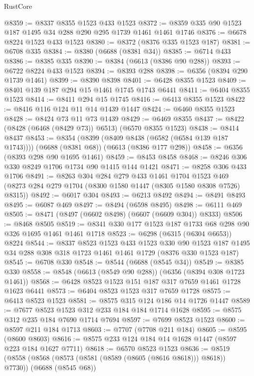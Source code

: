 \begin{lexlean}{RustCore}
\begin{coremodule}
@8359 := @8337 @8355 @1523 @433 @1523
@8372 := @8359 @335 @90 @1523 @187 @1495 @34 @288 @290 @295 @1739 @1461 @1461 @1746
@8376 := @6678 @8224 @1523 @433 @1523
@8380 := @8372 (@8376 @335 @1523 @187)
@8381 := @6708 @335
@8384 := @8380 (@6688 (@8381 @34))
@8385 := @6714 @433
@8386 := @8385 @335
@8390 := @8384 (@6613 (@8386 @90 @288))
@8393 := @6722 @8224 @433 @1523
@8394 := @8393 @288
@8398 := @6356 (@8394 @290 @1739 @1461)
@8399 := @8390 @8398
@8401 := @6428 @8355 @1523
@8409 := @8401 @139 @187 @294 @15 @1461 @1745 @1743 @6441
@8411 := @6404 @8355 @1523
@8414 := @8411 @294 @15 @1745
@8416 := @6413 @8355 @1523
@8422 := @8416 @116 @124 @11 @14 @1439 @1447
@8424 := @6460 @8355 @1523
@8428 := @8424 @73 @11 @73 @1439
@8429 := @6469 @8355
@8437 := @8422 (@8428 (@6468 (@8429 @73)) @6513) (@6570 @8355 @1523)
@8438 := @8414 @8437
@8453 := @8354
    (@8399 (@8409 @8438 (@6582 (@6584 @139 @187 @1743))))
    (@6688 (@8381 @68))
    (@6613 (@8386 @177 @298))
@8458 := @6356 (@8393 @298 @90 @1695 @1461)
@8459 := @8453 @8458
@8468 := @8246 @306 @330 @8249 @1706 @1734 @90 @1415 @144 @1421
@8471 := @8258 @306 @433 @1706
@8491 := @8263
    @304
    @284
    @279
    @433
    @1461
    @1704
    @1523
    @469
    (@8273 @284 @279 @1704 (@8300 @1580 @1447 (@8305 @1580 @8308 @7526) @8315))
@8492 := @6017 @304
@8493 := @6213 @8492
@8494 := @8491 @8493
@8495 := @6087 @469
@8497 := @8494 (@6598 @8495)
@8498 := @6111 @469
@8505 := @8471 (@8497 (@6602 @8498) (@6607 (@6609 @304)) @8333)
@8506 := @8468 @8505
@8519 := @8341 @330 @177 @1523 @187 @1733 @68 @298 @90 @326 @1695 @1461 @1461 @1718
@8523 := @6298 (@6315 (@6304 @6653)) @8224
@8544 := @8337
    @8523
    @1523
    @433
    @1523
    @330
    @90
    @1523
    @187
    @1495
    @34
    @288
    @308
    @318
    @1723
    @1461
    @1461
    @1729
    (@8376 @330 @1523 @187)
@8545 := @6708 @330
@8548 := @8544 (@6688 (@8545 @34))
@8549 := @8385 @330
@8558 := @8548 (@6613 (@8549 @90 @288)) (@6356 (@8394 @308 @1723 @1461))
@8568 := @6428 @8523 @1523 @151 @187 @317 @7659 @1461 @1728 @1623 @6441
@8573 := @6404 @8523 @1523 @317 @7659 @1728
@8575 := @6413 @8523 @1523
@8581 := @8575 @315 @124 @186 @14 @1726 @1447
@8589 := @7677 @8523 @1523 @312 @233 @184 @184 @1714 @1628
@8595 := @8575 @312 @235 @184 @7690 @1714 @7694
@8597 := @7699 @8523 @1523
@8600 := @8597 @211 @184 @1713
@8603 := @7707 (@7708 @211 @184)
@8605 := @8595 (@8600 @8603)
@8616 := @8575 @233 @124 @184 @14 @1628 @1447 (@8597 @223 @184 @1627 @7711)
@8618 := @6570 @8523 @1523
@8636 := @8519
    (@8558 (@8568 (@8573 (@8581 (@8589 (@8605 (@8616 @8618))) @8618)) @7730))
    (@6688 (@8545 @68))

\end{coremodule}
\end{lexlean}
